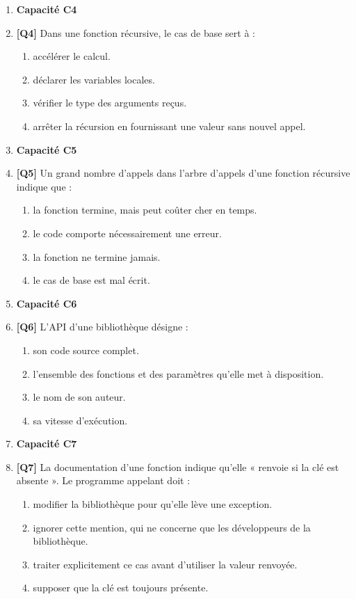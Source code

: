 \begin{enumerate}
\item[] \textbf{Capacité C4}

\item \textbf{[Q4]} Dans une fonction récursive, le cas de base sert à :
  \begin{enumerate}[label=\Alph*.]
    \item accélérer le calcul.
    \item déclarer les variables locales.
    \item vérifier le type des arguments reçus.
    \item arrêter la récursion en fournissant une valeur sans nouvel appel.
  \end{enumerate}

\item[] \textbf{Capacité C5}

\item \textbf{[Q5]} Un grand nombre d'appels dans l'arbre d'appels d'une fonction récursive indique que :
  \begin{enumerate}[label=\Alph*.]
    \item la fonction termine, mais peut coûter cher en temps.
    \item le code comporte nécessairement une erreur.
    \item la fonction ne termine jamais.
    \item le cas de base est mal écrit.
  \end{enumerate}

\item[] \textbf{Capacité C6}

\item \textbf{[Q6]} L'API d'une bibliothèque désigne :
  \begin{enumerate}[label=\Alph*.]
    \item son code source complet.
    \item l'ensemble des fonctions et des paramètres qu'elle met à disposition.
    \item le nom de son auteur.
    \item sa vitesse d'exécution.
  \end{enumerate}

\item[] \textbf{Capacité C7}

\item \textbf{[Q7]} La documentation d'une fonction indique qu'elle « renvoie  si la clé est absente ». Le programme appelant doit :
  \begin{enumerate}[label=\Alph*.]
    \item modifier la bibliothèque pour qu'elle lève une exception.
    \item ignorer cette mention, qui ne concerne que les développeurs de la bibliothèque.
    \item traiter explicitement ce cas avant d'utiliser la valeur renvoyée.
    \item supposer que la clé est toujours présente.
  \end{enumerate}


\end{enumerate}
